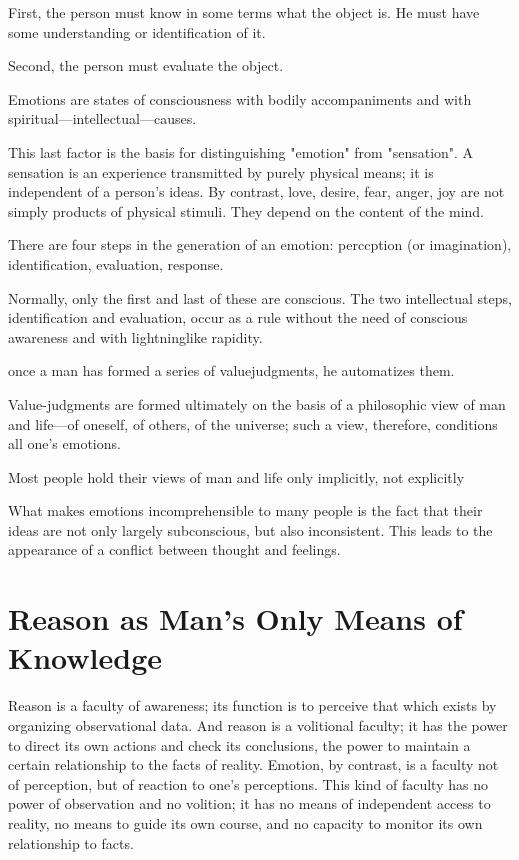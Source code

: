         First, the person must know in some terms what the object is. He must have some understanding or identification of it.
        
        Second, the person must evaluate the object.
        
        Emotions are states of consciousness with bodily accompaniments and with spiritual—intellectual—causes.
        
        This last factor is the basis for distinguishing "emotion" from "sensation". A sensation is an experience transmitted by purely physical means; it is independent of a person's ideas. By contrast, love, desire, fear, anger, joy are not simply products of physical stimuli. They depend on the content of the mind.
        
        There are four steps in the generation of an emotion: perccption (or imagination), identification, evaluation, response.
        
        Normally, only the first and last of these are conscious. The two intellectual steps, identification and evaluation, occur as a rule without the need of conscious awareness and with lightninglike rapidity.
        
        once a man has formed a series of valuejudgments, he automatizes them.
        
        Value-judgments are formed ultimately on the basis of a philosophic view of man and life—of oneself, of others, of the universe; such a view, therefore, conditions all one's emotions.
        
        Most people hold their views of man and life only implicitly, not explicitly
        
        What makes emotions incomprehensible to many people is the fact that their ideas are not only largely subconscious, but also inconsistent. This leads to the appearance of a conflict between thought and feelings.

    \section{Reason as Man's Only Means of Knowledge}
    
        Reason is a faculty of awareness; its function is to perceive that which exists by organizing observational data. And reason is a volitional faculty; it has the power to direct its own actions and check its conclusions, the power to maintain a certain relationship to the facts of reality. Emotion, by contrast, is a faculty not of perception, but of reaction to one's perceptions. This kind of faculty has no power of observation and no volition; it has no means of independent access to reality, no means to guide its own course, and no capacity to monitor its own relationship to facts.
        
